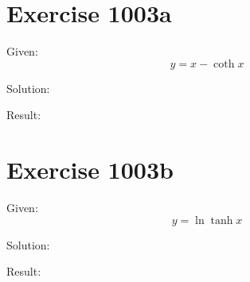 \documentclass[a4paper, 10pt]{scrartcl}
\begin{document}
\section{Exercise 1003a}

Given:
\[
y = x - \coth{x}
\]

Solution:

Result:

\section{Exercise 1003b}

Given:
\[
y = \ln{\tanh{x}}
\]

Solution:

Result:
\end{document}
